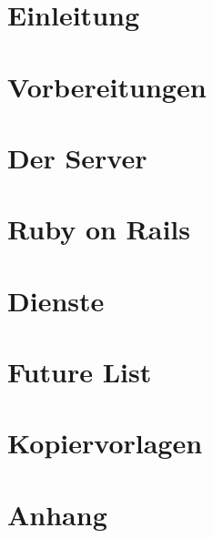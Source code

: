 \documentclass[11pt,a4paper,titlepage,openright,multicol]{scrbook}
\begin{document}
\frontmatter

\mainmatter



\tableofcontents

\part{Einleitung}
\label{part:Einleitung}




\part{Vorbereitungen}
\label{part:Vorbereitungen}




\part{Der Server}
\label{part:Der Server}
% 
% 
% 

\part{Ruby on Rails}
\label{part:Ruby on Rails}
%
%

\part{Dienste}
\label{part:Dienste}
%

\part{Future List}
\label{part:Future List}
%

\part{Kopiervorlagen}
\label{part:Kopiervorlagen}

\backmatter
\appendix
\part{Anhang}
\label{part:Anhang}



\printglossary

\listoffigures

\listoftables

\lstlistoflistings

\printindex

\end{document}
